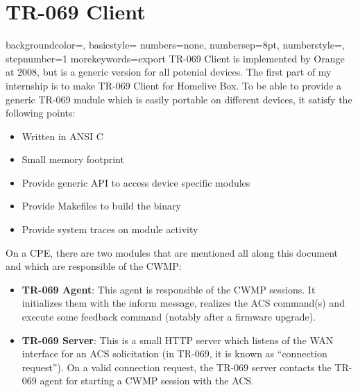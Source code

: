 
\chapter{TR-069 Client} %

\label{Chapter5} %


{
    backgroundcolor=\color{black},
    basicstyle=\scriptsize\color{white}\ttfamily
    numbers=none,
    numbersep=8pt,                   %
    numberstyle=\tiny\color{white}, %
    stepnumber=1                    %
}
{
  morekeywords={export}
}
TR-069 Client is implemented by Orange at 2008, but is a generic version for all potenial devices. The first part of my internship is to make TR-069 Client for Homelive Box. To be able to provide a generic TR-069 mudule which is easily portable on different devices, it satisfy the following points:

\begin{itemize}
  \item Written in ANSI C
  \item Small memory footprint
  \item Provide generic API to access device specific modules
  \item Provide Makefiles to build the binary
  \item Provide system traces on module activity
\end{itemize}

On a CPE, there are two modules that are mentioned all along this document and which are responsible of
the CWMP:
\begin{itemize}
  \item \textbf{TR-069 Agent}: This agent is responsible of the CWMP sessions. It initializes them with the inform message, realizes the ACS command(s) and execute some feedback command (notably after a firmware upgrade).
  \item \textbf{TR-069 Server}: This is a small HTTP server which listens of the WAN interface for an ACS solicitation (in TR-069, it is known as “connection request”). On a valid connection request, the TR-069 server contacts the TR-069 agent for starting a CWMP session with the ACS.
\end{itemize}
